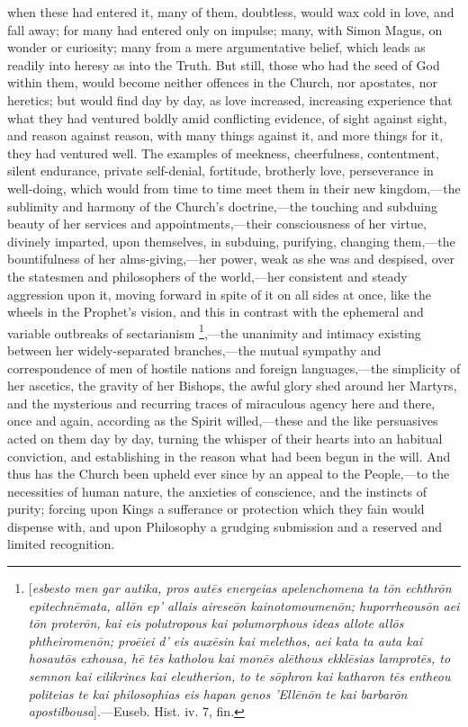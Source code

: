 when these had entered it, many of them, doubtless, would wax cold in
love, and fall away; for many had entered only on impulse; many, with
Simon Magus, on wonder or curiosity; many from a mere argumentative
belief, which leads as readily into heresy as into the Truth. But
still, those who had the seed of God within them, would become neither
offences in the Church, nor apostates, nor heretics; but would find
day by day, as love increased, increasing experience that what they
had ventured boldly amid conflicting evidence, of sight against sight,
and reason against reason, with many things against it, and more
things for it, they had ventured well. The examples of meekness,
cheerfulness, contentment, silent endurance, private self-denial,
fortitude, brotherly love, perseverance in well-doing, which would
from time to time meet them in their new kingdom,—the sublimity and
harmony of the Church's doctrine,—the touching and subduing beauty
of her services and appointments,—their consciousness of her virtue,
divinely imparted, upon themselves, in subduing, purifying,
changing them,—the bountifulness of her alms-giving,—her power,
weak as she was and despised, over the statesmen and philosophers of
the world,—her consistent and steady aggression upon it, moving
forward in spite of it on all sides at once, like the wheels in the
Prophet's vision, and this in contrast with the ephemeral and variable
outbreaks of sectarianism \footnote{[\emph{esbesto
men gar autika, pros aut\={e}s energeias apelenchomena ta t\={o}n
echthr\={o}n epitechn\={e}mata, all\={o}n ep' allais airese\={o}n
kainotomoumen\={o}n; huporrheous\={o}n aei t\={o}n proter\={o}n,
kai eis polutropous kai polumorphous ideas allote all\={o}s
phtheiromen\={o}n; pro\={e}iei d' eis aux\={e}sin kai
melethos, aei kata ta auta kai hosaut\={o}s exhousa, h\={e} t\={e}s
katholou kai mon\={e}s al\={e}thous ekkl\={e}sias lamprot\={e}s,
to semnon kai eilikrines kai eleutherion, to te s\={o}phron kai
katharon t\={e}s entheou politeias te kai philosophias eis hapan
genos 'Ell\={e}n\={o}n te kai barbar\={o}n apostilbousa}].—Euseb. Hist. iv.
7, fin.},—the
unanimity and intimacy existing between her widely-separated branches,—the
mutual sympathy and correspondence of men of hostile nations and
foreign languages,—the simplicity of her ascetics, the gravity of
her Bishops, the awful glory shed around her Martyrs, and the
mysterious and recurring traces of miraculous agency here and there,
once and again, according as the Spirit willed,—these and the like
persuasives acted on them day by day, turning the whisper of their
hearts into an habitual conviction, and establishing in the reason
what had been begun in the will. And thus has the Church been upheld
ever since by an appeal to the People,—to the necessities of human
nature, the anxieties of conscience, and the instincts of purity;
forcing upon Kings a sufferance or protection which they fain would
dispense with, and upon Philosophy a grudging submission and a
reserved and limited recognition.

